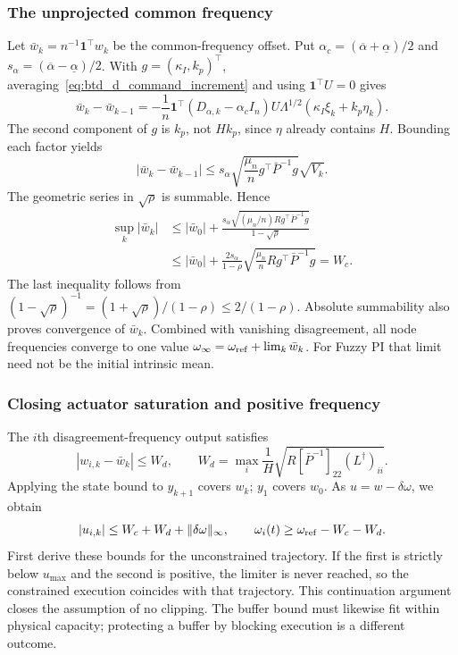 \subsubsection{The unprojected common frequency}
Let $\bar w_k=n^{-1}\mathbf1^\top w_k$ be the common-frequency offset.
Put $\alpha_c=(\overline\alpha+\underline\alpha)/2$ and
$s_\alpha=(\overline\alpha-\underline\alpha)/2$. With
$g=(\kappa_I,k_p)^\top$, averaging~\eqref{eq:btd_d_command_increment}
and using $\mathbf1^\top U=0$ gives
\begin{equation}
 \bar w_k-\bar w_{k-1}
 =-\frac1n\mathbf1^\top(D_{\alpha,k}-\alpha_c I_n)
 U\Lambda^{1/2}(\kappa_I\xi_k+k_p\eta_k).
 \label{eq:btd_d_common_increment}
\end{equation}
The second component of $g$ is $k_p$, not $Hk_p$, since $\eta$ already
contains $H$. Bounding each factor yields
\begin{equation}
 |\bar w_k-\bar w_{k-1}|
 \le s_\alpha\sqrt{\frac{\mu_n}{n}g^\top\bar P^{-1}g}\sqrt{V_k}.
 \label{eq:btd_d_common_step_bound}
\end{equation}
The geometric series in $\sqrt{\rho}$ is summable. Hence
\begin{align}
 \sup_k|\bar w_k|
 &\le |\bar w_0|+
 \frac{s_\alpha\sqrt{(\mu_n/n)R g^\top\bar P^{-1}g}}{1-\sqrt\rho}
 \nonumber\\
 &\le |\bar w_0|+\frac{2s_\alpha}{1-\rho}
 \sqrt{\frac{\mu_n}{n}R g^\top\bar P^{-1}g}=W_c.
 \label{eq:btd_clock_bounds}
\end{align}
The last inequality follows from
$(1-\sqrt\rho)^{-1}=(1+\sqrt\rho)/(1-\rho)\le2/(1-\rho)$.
Absolute summability also proves convergence of $\bar w_k$. Combined with
vanishing disagreement, all node frequencies converge to one value
$\omega_\infty=\omega_{\rm ref}+\lim_k\bar w_k$.
For Fuzzy PI that limit need not be the initial intrinsic mean.

\subsubsection{Closing actuator saturation and positive frequency}
The $i$th disagreement-frequency output satisfies
\begin{equation}
 |w_{i,k}-\bar w_k|\le W_d,
 \qquad W_d=\max_i\frac1H
 \sqrt{R[\bar P^{-1}]_{22}(L^\dagger)_{ii}}.
 \label{eq:btd_d_node_frequency}
\end{equation}
Applying the state bound to $y_{k+1}$ covers $w_k$; $y_1$ covers $w_0$.
As $u=w-\delta\omega$, we obtain
\begin{equation}
 |u_{i,k}|\le W_c+W_d+\|\delta\omega\|_\infty,
 \qquad \omega_i(t)\ge\omega_{\rm ref}-W_c-W_d.
 \label{eq:btd_actuator_bounds}
\end{equation}
First derive these bounds for the unconstrained trajectory. If the first
is strictly below $u_{\max}$ and the second is positive, the limiter is
never reached, so the constrained execution coincides with that trajectory.
This continuation argument closes the assumption of no clipping. The
buffer bound must likewise fit within physical capacity; protecting a
buffer by blocking execution is a different outcome.

